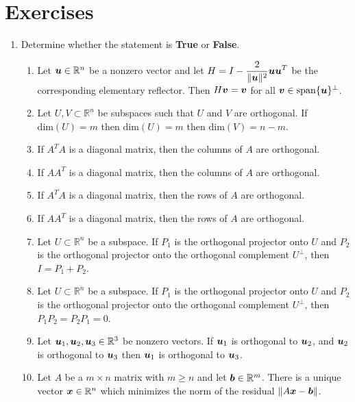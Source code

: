 \section{Exercises}

\begin{enumerate}[leftmargin=*]
\item Determine whether the statement is {\bf True} or {\bf False}.
\begin{enumerate}
\item Let $\boldsymbol{u} \in \mathbb{R}^n$ be a nonzero vector and let $\displaystyle H = I - \frac{2}{\| \boldsymbol{u} \|^2}\boldsymbol{u} \boldsymbol{u}^T$ be the corresponding elementary reflector. Then  $H \boldsymbol{v} = \boldsymbol{v}$ for all $\boldsymbol{v} \in \mathrm{span} \{ \boldsymbol{u} \}^{\perp}$.
\item Let $U,V \subset \mathbb{R}^n$ be subspaces such that $U$ and $V$ are orthogonal. If $\mathrm{dim}(U) = m$ then $\mathrm{dim}(U) = m$ then $\mathrm{dim}(V) = n - m$.
\item If $A^TA$ is a diagonal matrix, then the columns of $A$ are orthogonal.
\item If $AA^T$ is a diagonal matrix, then the columns of $A$ are orthogonal.
\item If $A^TA$ is a diagonal matrix, then the rows of $A$ are orthogonal.
\item If $AA^T$ is a diagonal matrix, then the rows of $A$ are orthogonal.
\item Let $U \subset \mathbb{R}^n$ be a subspace. If $P_1$ is the orthogonal projector onto $U$ and $P_2$ is the orthogonal projector onto the orthogonal complement $U^{\perp}$, then $I = P_1 + P_2$.
\item Let $U \subset \mathbb{R}^n$ be a subspace. If $P_1$ is the orthogonal projector onto $U$ and $P_2$ is the orthogonal projector onto the orthogonal complement $U^{\perp}$, then $P_1P_2 = P_2P_1 = 0$.
\item Let $\boldsymbol{u}_1,\boldsymbol{u}_2,\boldsymbol{u}_3 \in \mathbb{R}^3$ be nonzero vectors. If $\boldsymbol{u}_1$ is orthogonal to $\boldsymbol{u}_2$, and $\boldsymbol{u}_2$ is orthogonal to $\boldsymbol{u}_3$ then $\boldsymbol{u}_1$ is orthogonal to $\boldsymbol{u}_3$.
\item Let $A$ be a $m \times n$ matrix with $m \geq n$ and let $\boldsymbol{b} \in \mathbb{R}^m$. There is a unique vector $\boldsymbol{x} \in \mathbb{R}^n$ which minimizes the norm of the residual $\| A \boldsymbol{x} - \boldsymbol{b} \|$.

\end{enumerate}
\end{enumerate}
